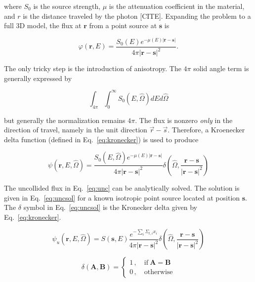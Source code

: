 \noindent where $S_0$ is the source strength, $\mu$ is the attenuation coefficient in the material, and $r$ is the distance traveled by the photon [CITE]. Expanding the problem to a full 3D model, the flux at $\boldsymbol{r}$ from a point source at $\boldsymbol{s}$ is

\begin{equation}\label{eq:isouncol}
\varphi(\boldsymbol{r}, E) = \frac{S_0(E) e^{-\mu(E) |\boldsymbol{r}-\boldsymbol{s}|}}{4 \pi |\boldsymbol{r}-\boldsymbol{s}|^2}.
\end{equation}

\noindent
The only tricky step is the introduction of anisotropy. The $4 \pi$ solid angle term is generally expressed by

\begin{equation}
\int_{4 \pi}^{} \int_{0}^{\infty} S_0(E, \hat{\Omega}) dE d\hat{\Omega}
\end{equation}

\noindent
but generally the normalization remains $4 \pi$. The flux is nonzero \textit{only} in the direction of travel, namely in the unit direction $\vec{r} - \vec{s}$. Therefore, a Kroenecker delta function (defined in Eq.~\ref{eq:kronecker}) is used to produce

\begin{equation}
\psi(\boldsymbol{r}, E, \hat{\Omega}) = \frac{S_0(E, \hat{\Omega}) e^{-\mu(E) |\boldsymbol{r}-\boldsymbol{s}|}}{4 \pi |\boldsymbol{r}-\boldsymbol{s}|^2} \delta \left( \hat{\Omega}, \frac{\boldsymbol{r} - \boldsymbol{s}}{|\boldsymbol{r} - \boldsymbol{s}|^2}\right)
\end{equation}



The uncollided flux in Eq.~\ref{eq:unc} can be analytically solved. The solution is given in Eq.~\ref{eq:uncsol} for a known isotropic point source located at position $\boldsymbol{s}$. The $\delta$ symbol in Eq.~\ref{eq:uncsol} is the Kronecker delta given by Eq.~\ref{eq:kronecker}. 

\begin{equation} \label{eq:uncsol}
\psi_u(\boldsymbol{r}, E, \hat{\Omega}) = 
S(\boldsymbol{s}, E)
\frac{e^{-\sum_i \Sigma_{t,i} x_i}}{4\pi |\boldsymbol{r}-\boldsymbol{s}|^2}
\delta\left( \hat{\Omega}, \frac{\boldsymbol{r}-\boldsymbol{s}}{|\boldsymbol{r}-\boldsymbol{s}|^2}\right)
\end{equation}

\begin{equation} \label{eq:kronecker}
\delta(\boldsymbol{A}, \boldsymbol{B}) = 
\begin{cases}
1 \,, \quad \mathrm{if} \ \boldsymbol{A}=\boldsymbol{B} \\
0 \,, \quad \mathrm{otherwise}
\end{cases}
\end{equation}

